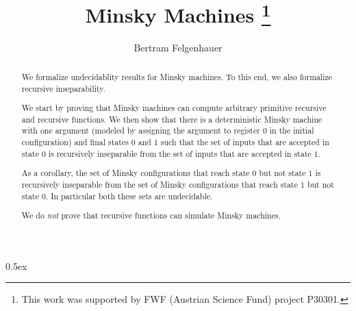 \documentclass[11pt,a4paper]{article}
\begin{document}
\title{Minsky Machines%
\thanks{This work was supported by FWF (Austrian Science Fund) project P30301.}}
\author{Bertram Felgenhauer}
\maketitle

\begin{abstract}
We formalize undecidablity results for Minsky machines. To this end, we also formalize recursive
inseparability.

We start by proving that Minsky machines can compute arbitrary primitive recursive and recursive
functions. We then show that there is a deterministic Minsky machine with one argument (modeled by
assigning the argument to register $0$ in the initial configuration) and final states $0$ and $1$
such that the set of inputs that are accepted in state $0$ is recursively inseparable from the set
of inputs that are accepted in state $1$.

As a corollary, the set of Minsky configurations that reach state $0$ but not state $1$ is
recursively inseparable from the set of Minsky configurations that reach state $1$ but not
state $0$. In particular both these sets are undecidable.

We do \emph{not} prove that recursive functions can simulate Minsky machines.
\end{abstract}

\tableofcontents

\parindent 0pt\parskip 0.5ex





\end{document}
